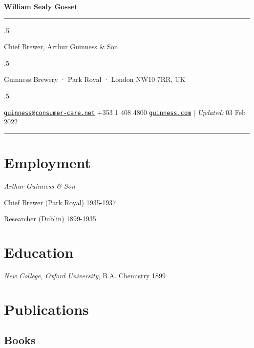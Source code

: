 \documentclass[11pt,]{article}
\begin{document}
\centerline{\huge \bf William Sealy Gosset}

\vspace{2 mm}

\hrule

\vspace{2 mm}

\moveleft.5\hoffset\centerline{Chief Brewer, Arthur Guinness \& Son}
\moveleft.5\hoffset\centerline{Guinness Brewery · Park Royal · London
NW10 7RR, UK}
\moveleft.5\hoffset\centerline{ \faEnvelopeO \hspace{1 mm} \href{mailto:}{\tt \href{mailto:guinness@consumer-care.net}{\nolinkurl{guinness@consumer-care.net}}} \hspace{1 mm}  \faPhone \hspace{1 mm}  +353
1 408
4800  \hspace{1 mm}       \faGlobe \hspace{1 mm} \href{http://guinness.com}{\tt guinness.com}    | \emph{Updated:} 03
Feb 2022}



\vspace{2 mm}

\hrule



\hypertarget{employment}{%
\section{Employment}\label{employment}}

\emph{Arthur Guinness \& Son}

Chief Brewer (Park Royal) \hfill 1935-1937

Researcher (Dublin) \hfill 1899-1935

\hypertarget{education}{%
\section{Education}\label{education}}

\emph{New College, Oxford University}, B.A. Chemistry \hfill 1899

\hypertarget{publications}{%
\section{Publications}\label{publications}}

\hypertarget{books}{%
\subsection{Books}\label{books}}
\end{document}
